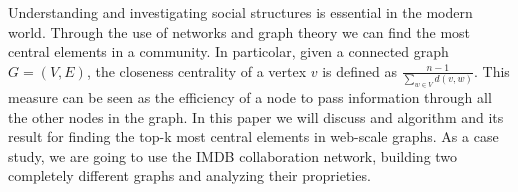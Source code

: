 Understanding and investigating social structures is essential in the modern world. Through the use of networks and graph theory we can find the most central elements in a community. In particolar, given a connected graph $G=(V,E)$, the closeness centrality of a vertex $v$ is defined as $ \frac{n-1}{\sum_{w \in V} d(v,w)}$. This measure can be seen as the efficiency of a node to pass information through all the other nodes in the graph. In this paper we will discuss and algorithm and its result for finding the top-k most central elements in web-scale graphs. As a case study, we are going to use the IMDB collaboration network, building two completely different graphs and analyzing their proprieties.


